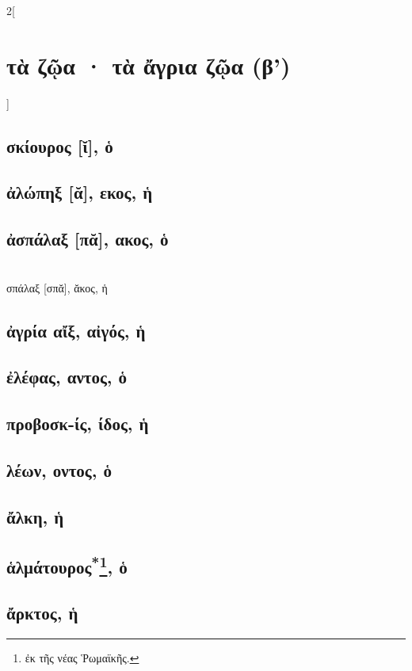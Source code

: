 \documentclass{book}
\begin{document}
\begin{multicols}{2}[\section{τὰ ζῷα · τὰ ἄγρια ζῷα (β')}]
\subsection{σκίουρος [ῐ], ὁ}
\subsection{ἀλώπηξ [ᾰ], εκος, ἡ}
\subsection{ἀσπάλαξ [πᾰ], ακος, ὁ}
 ~\\
σπάλαξ [σπᾰ], ᾰκος, ἡ
\subsection{ἀγρία αἴξ, αἰγός, ἡ}
\subsection{ἐλέφας, αντος, ὁ}
\subsection{προβοσκ-ίς, ίδος, ἡ}
\subsection{λέων, οντος, ὁ}
\subsection{ἄλκη, ἡ}
\subsection{ἁλμάτουρος\textsuperscript{*}\protect\footnote{ἐκ τῆς νέας Ῥωμαϊκῆς.}, ὁ}
\subsection{ἄρκτος, ἡ}

\end{multicols}
\end{document}
